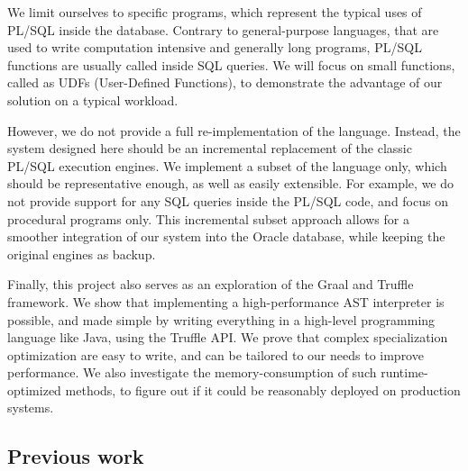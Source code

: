 \documentclass[twoside,11pt,a4paper]{article}
\begin{document}
We limit ourselves to specific programs, which represent the typical uses of PL/SQL inside the database. Contrary to general-purpose languages, that are used to write computation intensive and generally long programs, PL/SQL functions are usually called inside SQL queries. We will focus on small functions, called as UDFs (User-Defined Functions), to demonstrate the advantage of our solution on a typical workload.


However, we do not provide a full re-implementation of the language. Instead, the system designed here should be an incremental replacement of the classic PL/SQL execution engines. We implement a subset of the language only, which should be representative enough, as well as easily extensible. For example, we do not provide support for any SQL queries inside the PL/SQL code, and focus on procedural programs only. This incremental subset approach allows for a smoother integration of our system into the Oracle database, while keeping the original engines as backup.

Finally, this project also serves as an exploration of the Graal and Truffle framework. We show that implementing a high-performance AST interpreter is possible, and made simple by writing everything in a high-level programming language like Java, using the Truffle API. We prove that complex specialization optimization are easy to write, and can be tailored to our needs to improve performance. We also investigate the memory-consumption of such runtime-optimized methods, to figure out if it could be reasonably deployed on production systems.

\subsection{Previous work}
\end{document}
